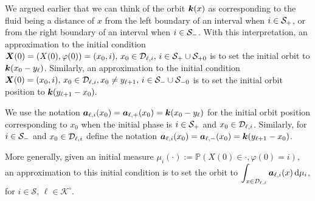 We argued earlier that we can think of the orbit \(\boldsymbol k(x)\) as corresponding to the fluid being a distance of \(x\) from the left boundary of an interval when \(i\in\mathcal{S}_+\), or from the right boundary of an interval when \(i\in\mathcal{S}_-\). With this interpretation, an approximation to the initial condition \(\boldsymbol X(0) = (X(0),\varphi(0))=(x_0,i),\,x_0\in\mathcal D_{\ell,i},\,i\in\mathcal S_+\cup\mathcal{S}_{+0}\) is to set the initial orbit to \(\boldsymbol k(x_0-y_{\ell})\). Similarly, an approximation to the initial condition \(\boldsymbol X(0)=(x_0,i), \,x_0\in\mathcal D_{\ell,i}, x_0\neq y_{\ell+1},\,i\in\mathcal S_-\cup\mathcal{S}_{-0}\) is to set the initial orbit position to \(\boldsymbol k(y_{\ell+1}-x_0).\) 

We use the notation \(\boldsymbol a_{\ell,i}(x_0) = \boldsymbol a_{\ell,+}(x_0) = \boldsymbol k(x_0-y_\ell)\) for the initial orbit position corresponding to \(x_0\) when the initial phase is \(i\in\mathcal{S}_+\) and \(x_0\in\mathcal{D}_{\ell,i}\). Similarly, for \(i\in\mathcal{S}_-\) and \(x_0\in\mathcal{D}_{\ell,i}\) define the notation \(\boldsymbol a_{\ell,i}(x_0) = \boldsymbol a_{\ell,-}(x_0) = \boldsymbol k(y_{\ell+1}-x_0)\). 

More generally, given an initial measure \(\mu_i(\cdot):= \mathbb P(X(0)\in\cdot,\varphi(0)=i)\), an approximation to this initial condition is to set the orbit to \(\displaystyle\int_{x\in\mathcal{D}_{\ell,i}}\boldsymbol a_{\ell,i} (x) \, \mathrm{d} \mu_i\), for \(i\in\mathcal S,\, \ell\in\mathcal K^\circ\). 

